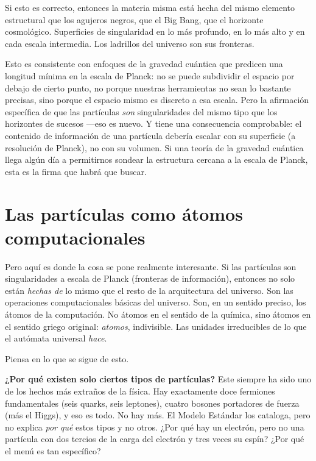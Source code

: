 \documentclass[11pt, twoside, openright]{book}
\begin{document}
Si esto es correcto, entonces la materia misma está hecha del mismo elemento estructural que los agujeros negros, que el Big Bang, que el horizonte cosmológico. Superficies de singularidad en lo más profundo, en lo más alto y en cada escala intermedia. Los ladrillos del universo son sus fronteras.

Esto es consistente con enfoques de la gravedad cuántica que predicen una longitud mínima en la escala de Planck: no se puede subdividir el espacio por debajo de cierto punto, no porque nuestras herramientas no sean lo bastante precisas, sino porque el espacio mismo es discreto a esa escala. Pero la afirmación específica de que las partículas \textit{son} singularidades del mismo tipo que los horizontes de sucesos ---eso es nuevo. Y tiene una consecuencia comprobable: el contenido de información de una partícula debería escalar con su superficie (a resolución de Planck), no con su volumen. Si una teoría de la gravedad cuántica llega algún día a permitirnos sondear la estructura cercana a la escala de Planck, esta es la firma que habrá que buscar.

\section*{Las partículas como átomos computacionales}

Pero aquí es donde la cosa se pone realmente interesante. Si las partículas son singularidades a escala de Planck (fronteras de información), entonces no solo están \textit{hechas de} lo mismo que el resto de la arquitectura del universo. Son las operaciones computacionales básicas del universo. Son, en un sentido preciso, los átomos de la computación. No átomos en el sentido de la química, sino átomos en el sentido griego original: \textit{atomos}, indivisible. Las unidades irreducibles de lo que el autómata universal \textit{hace}.

Piensa en lo que se sigue de esto.

\textbf{¿Por qué existen solo ciertos tipos de partículas?} Este siempre ha sido uno de los hechos más extraños de la física. Hay exactamente doce fermiones fundamentales (seis quarks, seis leptones), cuatro bosones portadores de fuerza (más el Higgs), y eso es todo. No hay más. El Modelo Estándar los cataloga, pero no explica \textit{por qué} estos tipos y no otros. ¿Por qué hay un electrón, pero no una partícula con dos tercios de la carga del electrón y tres veces su espín? ¿Por qué el menú es tan específico?
\end{document}

